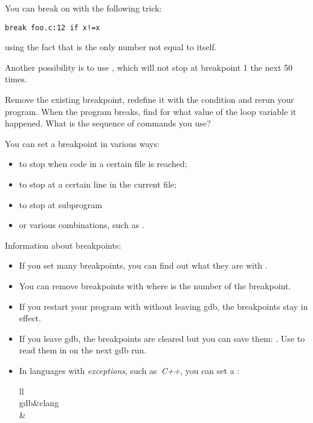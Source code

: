 \begin{remark}
  You can break on  with the following trick:
\begin{verbatim}
break foo.c:12 if x!=x
\end{verbatim}
  using the fact that  is the only number not equal to itself.
\end{remark}

Another possibility is to use , which will not stop at
breakpoint 1 the next 50 times.

Remove the existing breakpoint, redefine it with the condition 
and rerun your program. When the program breaks, find for what value
of the loop variable it happened. What is the sequence of commands you use?

You can set a breakpoint in various ways:
\begin{itemize}
\item {} to stop when code in a certain file is reached;
\item {} to stop at a certain line in the current file;
\item {} to stop at subprogram 
\item or various combinations, such as .
\end{itemize}

Information about breakpoints:

\begin{itemize}
\item If you set many breakpoints, you can find out what they are with
  . 
\item You can remove breakpoints with  where  is the
  number of the breakpoint.
\item If you restart your program with  without leaving gdb,
  the breakpoints stay in effect.
\item If you leave gdb, the breakpoints are cleared but you can save
  them: . Use  to read
  them in on the next gdb run.
\item In languages with \emph{exceptions}, such
  as~\emph{C++}, you can set a :

  \begin{fntable}{ll}
    \\
    \midrule
    gdb&clang\\   &\\
  \end{fntable}

\end{itemize}

